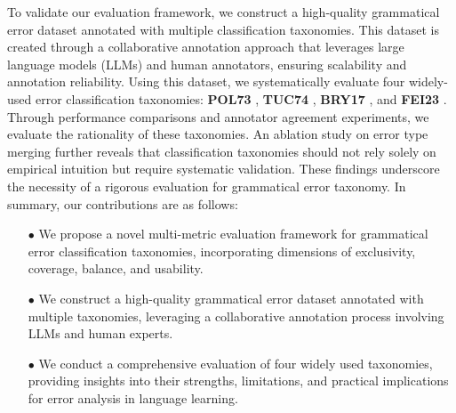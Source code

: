 To validate our evaluation framework, we construct a high-quality grammatical error dataset annotated with multiple classification taxonomies. This dataset is created through a collaborative annotation approach that leverages large language models (LLMs) and human annotators, ensuring scalability and annotation reliability. Using this dataset, we systematically evaluate four widely-used error classification taxonomies: \textbf{POL73} \citep{linguistic_one}, \textbf{TUC74} \citep{gooficon}, \textbf{BRY17} \citep{errant}, and \textbf{FEI23} \citep{enhancing}. Through performance comparisons and annotator agreement experiments, we evaluate the rationality of these taxonomies. An ablation study on error type merging further reveals that classification taxonomies should not rely solely on empirical intuition but require systematic validation. These findings underscore the necessity of a rigorous evaluation for grammatical error taxonomy. In summary, our contributions are as follows:

\begin{itemize}[leftmargin=*]
\item[$\bullet$] We propose a novel multi-metric evaluation framework for grammatical error classification taxonomies, incorporating dimensions of exclusivity, coverage, balance, and usability.

\item[$\bullet$] We construct a high-quality grammatical error dataset annotated with multiple taxonomies, leveraging a collaborative annotation process involving LLMs and human experts.

\item[$\bullet$] We conduct a comprehensive evaluation of four widely used taxonomies, providing insights into their strengths, limitations, and practical implications for error analysis in language learning.
\end{itemize}





